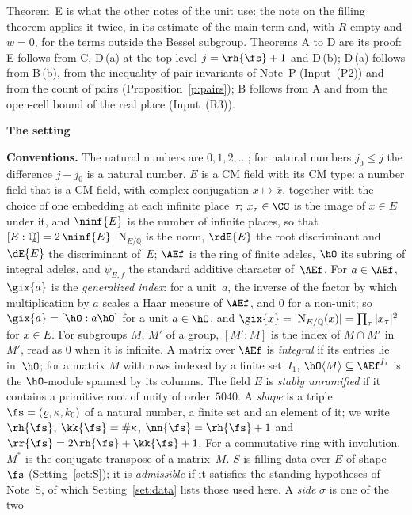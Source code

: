 \documentclass[11pt,a4paper]{article}
\newcommand{\Q}{\mathbb{Q}}
\newcommand{\m}[1]{\mbox{$#1$}}        %
\newcommand{\sect}[2]{\refstepcounter{section}\label{#2}\par\addvspace{19pt plus 4pt minus 2pt}\Needspace{7\baselineskip}%
  \noindent\llap{{\fontsize{13.2}{16}\selectfont\bfseries\color{inkfaint}\thesection}\hspace{9pt}}%
  {\fontsize{13.2}{16}\selectfont\bfseries\color{ink}#1}\par\nopagebreak\vspace{-1pt}}
\theoremstyle{plainx}
\theoremstyle{uprightx}
\newenvironment{conventions}{\par\addvspace{5pt}\noindent\textbf{Conventions.}\enspace\ignorespaces}{\par\addvspace{3pt}}
\renewcommand{\m}[1]{$#1$}
\newcommand{\sk}{\kk{\fs}}
\newcommand{\sn}{\nn{\fs}}
\newcommand{\sro}{\rh{\fs}}
\newcommand{\fE}{\ninf{E}}
\newcommand{\cj}[1]{\overline{#1}}
\newcommand{\Nm}{\mathrm{N}_{E/\Q}}
\newcommand{\inp}[1]{\textup{(#1)}}
\begin{document}
Theorem~E is what the other notes of the unit use: the note on the filling theorem applies it twice, in its
estimate of the main term and, with $R$ empty and \m{w=0}, for the terms outside the Bessel subgroup. Theorems A to D are its proof: E follows from C, D\,(a) at the top level \m{j=\sro+1} and
D\,(b); D\,(a) follows from B\,(b), from the inequality of pair invariants of Note~P (Input~\inp{P2}) and from the
count of pairs (Proposition~\ref{p:pairs}); B follows from A and from the open-cell bound of the real place
(Input~\inp{R3}).

\sect{The setting}{s:setting}
\begin{conventions}\label{c:conventions}
The natural numbers are \m{0,1,2,\dots}; for natural numbers \m{j_0\le j} the difference \m{j-j_0} is a natural
number. $E$ is a CM field with its CM type: a number field that is a CM field, with complex conjugation
\m{x\mapsto\cj x}, together with the choice of one embedding at each infinite place~$\tau$; \m{x_\tau\in\CC} is
the image of \m{x\in E} under it, and \m{\fE} is the number of infinite places, so that \m{[E:\Q]=2\,\fE}.
\m{\Nm} is the norm, \m{\rdE{E}} the root discriminant and \m{\dE{E}} the discriminant of~$E$; \m{\AEf} is the
ring of finite adeles, \m{\hO} its subring of integral adeles, and \m{\psi_{E,f}} the standard additive character
of~\m{\AEf}. For \m{a\in\AEf}, \m{\gix{a}} is the \emph{generalized index}: for a unit~$a$, the inverse of the factor
by which multiplication by $a$ scales a Haar measure of \m{\AEf}, and $0$ for a non-unit; so
\m{\gix{a}=[\hO:a\hO]} for a unit \m{a\in\hO}, and \m{\gix{x}=|\Nm(x)|=\prod_\tau|x_\tau|^2} for \m{x\in E}. For subgroups $M$, $M'$
of a group, \m{[M':M]} is the index of \m{M\cap M'} in~$M'$, read as $0$ when it is infinite. A matrix over
\m{\AEf} is \emph{integral} if its entries lie in~\m{\hO}; for a matrix $M$ with rows indexed by a finite set~$I_1$,
\m{\hO\langle M\rangle\subseteq\AEf^{I_1}} is the \m{\hO}-module spanned by its columns. The field $E$ is \emph{stably unramified} if it
contains a primitive root of unity of order~$5040$. A \emph{shape} is a triple \m{\fs=(\varrho,\kappa,k_0)} of a natural
number, a finite set and an element of it; we write \m{\sro}, \m{\sk=\#\kappa}, \m{\sn=\sro+1} and
\m{\rr{\fs}=2\sro+\sk+1}. For a commutative ring with involution, $M^*$ is the conjugate transpose of a
matrix~$M$. $S$ is filling data over $E$ of shape $\fs$ (Setting~\ref{set:S}); it is \emph{admissible} if it
satisfies the standing hypotheses of Note~S, of which Setting~\ref{set:data} lists those used here. A \emph{side} $\sigma$ is one of the two

\end{conventions}
\end{document}
